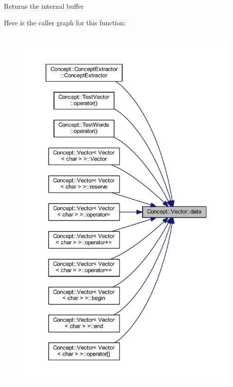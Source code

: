 \begin{DoxyReturn}{Returns}
the internal buffer 
\end{DoxyReturn}
Here is the caller graph for this function\+:\nopagebreak
\begin{figure}[H]
\begin{center}
\leavevmode
\includegraphics[height=550pt]{class_concept_1_1_vector_a37d79a7609e4493dd0c10ab5948914ec_icgraph}
\end{center}
\end{figure}
\mbox{\label{class_concept_1_1_vector_a62b7aace523228b3c8dadf4c898cc01a}} 
